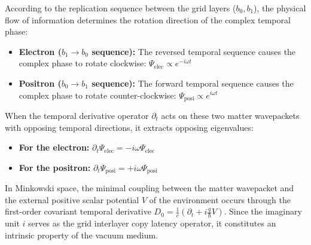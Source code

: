 \documentclass[12pt, a4paper]{article}
\begin{document}
According to the replication sequence between the grid layers ($b_0, b_1$), the physical flow of information determines the rotation direction of the complex temporal phase:
\begin{itemize}
    \item \textbf{Electron ($b_1 \to b_0$ sequence):} The reversed temporal sequence causes the complex phase to rotate clockwise: $\Psi_{\mathrm{elec}} \propto e^{-i\omega t}$
    \item \textbf{Positron ($b_0 \to b_1$ sequence):} The forward temporal sequence causes the complex phase to rotate counter-clockwise: $\Psi_{\mathrm{posi}} \propto e^{i\omega t}$
\end{itemize}
When the temporal derivative operator $\partial_t$ acts on these two matter wavepackets with opposing temporal directions, it extracts opposing eigenvalues:
\begin{itemize}
    \item \textbf{For the electron:} $\partial_t \Psi_{\mathrm{elec}} = -i\omega \Psi_{\mathrm{elec}}$
    \item \textbf{For the positron:} $\partial_t \Psi_{\mathrm{posi}} = +i\omega \Psi_{\mathrm{posi}}$
\end{itemize}
In Minkowski space, the minimal coupling between the matter wavepacket and the external positive scalar potential $V$ of the environment occurs through the first-order covariant temporal derivative $D_0 = \frac{1}{c} \left( \partial_t + i \frac{q}{\hbar} V \right)$. Since the imaginary unit $i$ serves as the grid interlayer copy latency operator, it constitutes an intrinsic property of the vacuum medium.
\end{document}

